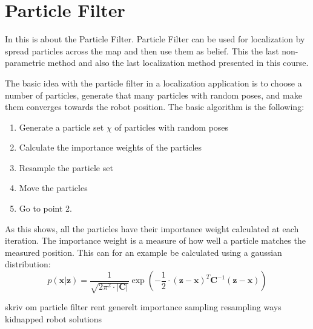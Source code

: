 \documentclass[Main]{subfiles}
\begin{document}
\section{Particle Filter} %
	\label{sec:particlefilter}
In this is about the Particle Filter. 
Particle Filter can be used for localization by spread particles across the map and then use them as belief. This the last non-parametric method and also the last localization method presented in this course.

The basic idea with the particle filter in a localization application is to choose a number of particles, generate that many particles with random poses, and make them converges towards the robot position.
The basic algorithm is the following:
\begin{enumerate}
\item Generate a particle set $\chi$ of particles with random poses 
\item Calculate the importance weights of the particles 
\item Resample the particle set
\item Move the particles
\item Go to point 2.
\end{enumerate}
As this shows, all the particles have their importance weight calculated at each iteration.
The importance weight is a measure of how well a particle matches the measured position.
This can for an example be calculated using a gaussian distribution:
\begin{equation}
	p(\mathbf{x}|\mathbf{z}) = \frac{1}{\sqrt{2\pi^2 \cdot |\mathbf{C}|}} \exp \left( -\frac{1}{2}\cdot (\mathbf{z}-\mathbf{x})^T \mathbf{C}^{-1} (\mathbf{z}-\mathbf{x}) \right)
\end{equation}


skriv om particle filter rent generelt
importance sampling
resampling ways
kidnapped robot solutions

\end{document}
